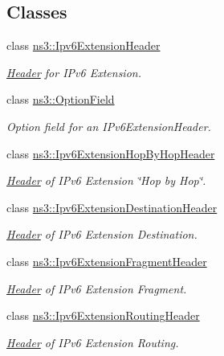 \subsection*{Classes}
\begin{DoxyCompactItemize}
\item 
class \hyperlink{classns3_1_1Ipv6ExtensionHeader}{ns3\+::\+Ipv6\+Extension\+Header}
\begin{DoxyCompactList}\small\item\em \hyperlink{classns3_1_1Header}{Header} for I\+Pv6 Extension. \end{DoxyCompactList}\item 
class \hyperlink{classns3_1_1OptionField}{ns3\+::\+Option\+Field}
\begin{DoxyCompactList}\small\item\em Option field for an I\+Pv6\+Extension\+Header. \end{DoxyCompactList}\item 
class \hyperlink{classns3_1_1Ipv6ExtensionHopByHopHeader}{ns3\+::\+Ipv6\+Extension\+Hop\+By\+Hop\+Header}
\begin{DoxyCompactList}\small\item\em \hyperlink{classns3_1_1Header}{Header} of I\+Pv6 Extension \char`\"{}\+Hop by Hop\char`\"{}. \end{DoxyCompactList}\item 
class \hyperlink{classns3_1_1Ipv6ExtensionDestinationHeader}{ns3\+::\+Ipv6\+Extension\+Destination\+Header}
\begin{DoxyCompactList}\small\item\em \hyperlink{classns3_1_1Header}{Header} of I\+Pv6 Extension Destination. \end{DoxyCompactList}\item 
class \hyperlink{classns3_1_1Ipv6ExtensionFragmentHeader}{ns3\+::\+Ipv6\+Extension\+Fragment\+Header}
\begin{DoxyCompactList}\small\item\em \hyperlink{classns3_1_1Header}{Header} of I\+Pv6 Extension Fragment. \end{DoxyCompactList}\item 
class \hyperlink{classns3_1_1Ipv6ExtensionRoutingHeader}{ns3\+::\+Ipv6\+Extension\+Routing\+Header}
\begin{DoxyCompactList}\small\item\em \hyperlink{classns3_1_1Header}{Header} of I\+Pv6 Extension Routing. \end{DoxyCompactList}\item 

\end{DoxyCompactItemize}
